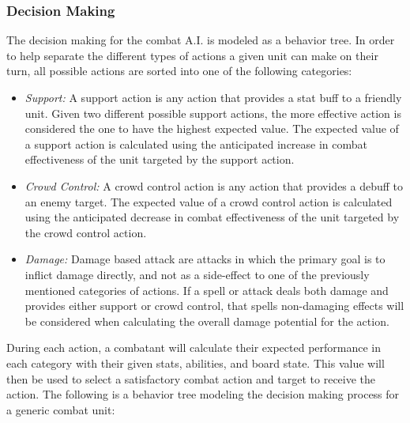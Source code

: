 \documentclass[letterpaper, 10 pt, conference]{ieeeconf}
\begin{document}
\subsubsection{Decision Making}
The decision making for the combat A.I. is modeled as a behavior tree. In order to help separate the different types of actions a given unit can make
on their turn, all possible actions are sorted into one of the following categories:
\begin{itemize}
	\item \textit{Support:}  A support action is any action that provides a stat buff to a
	friendly unit. Given two different possible support actions, the more effective
	action is considered the one to have the highest expected value. The
	expected value of a support action is calculated using the anticipated increase
	in combat effectiveness of the unit targeted by the support action.
	\item \textit{Crowd Control:} A crowd control action is any action that provides a
	debuff to an enemy target. The expected value of a crowd control action is
	calculated using the anticipated decrease in combat effectiveness of the unit
	targeted by the crowd control action.
	\item \textit{Damage:} Damage based attack are attacks in which the primary goal is
	to inflict damage directly, and not as a side-effect to one of the previously
	mentioned categories of actions. If a spell or attack deals both damage and
	provides either support or crowd control, that spells non-damaging effects
	will be considered when calculating the overall damage potential for the
	action.
\end{itemize}
\par
During each action, a combatant will calculate their expected performance in
each category with their given stats, abilities, and board state. This value will
then be used to select a satisfactory combat action and target to receive the action.
The following is a behavior tree modeling the decision making process for a
generic combat unit:
\end{document}
